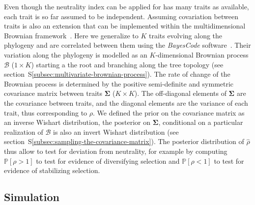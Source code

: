 \documentclass{article}
\newcommand{\UniDimArray}[1]{\bm{#1}}
\newcommand{\BiDimArray}[1]{\bm{#1}}
\newcommand{\proba}{\mathbb{P}}
\newcommand{\NI}{\rho}
\newcommand{\EstNI}{\widehat{\rho}}
\newcommand{\Ntrait}{K}
\newcommand{\Covariancematrix}{\Sigma}
\newcommand{\CovarianceMatrix}{\BiDimArray{\Covariancematrix}}
\newcommand{\brownian}{\mathcal{B}}
\newcommand{\Brownian}{\UniDimArray{\brownian}}
\begin{document}
Even though the neutrality index can be applied for has many traits as available, each trait is so far assumed to be independent.
Assuming covariation between traits is also an extension that can be implemented within the multidimensional Brownian framework~\cite{huelsenbeck_detecting_2003, lartillot_phylogenetic_2011, lartillot_joint_2012, latrille_inferring_2021}.
Here we generalize to $\Ntrait$ traits evolving along the phylogeny and are correlated between them using the \textit{BayesCode} software~\cite{latrille_inferring_2021}.
Their variation along the phylogeny is modelled as an $\Ntrait$-dimensional Brownian process $\Brownian$ ($1 \times \Ntrait$) starting a the root and branching along the tree topology (see section~S\ref{subsec:multivariate-brownian-process}).
The rate of change of the Brownian process is determined by the positive semi-definite and symmetric covariance matrix between traits $\CovarianceMatrix$ ($\Ntrait \times \Ntrait$).
The off-diagonal elements of $\CovarianceMatrix$ are the covariance between traits, and the diagonal elements are the variance of each trait, thus corresponding to $\NI$.
We defined the {prior} on the covariance matrix as an inverse Wishart distribution, the {posterior} on $\CovarianceMatrix$, conditional on a particular realization of $\brownian$ is also an invert Wishart distribution (see section~S\ref{subsec:sampling-the-covariance-matrix}).
The posterior distribution of $\EstNI$ thus allow to test for deviation from neutrality, for example by computing $\proba [\NI > 1 ]$ to test for evidence of diversifying selection and $\proba [\NI < 1 ]$ to test for evidence of stabilizing selection.

\subsection*{Simulation}\label{subsec:simulations}
\end{document}
